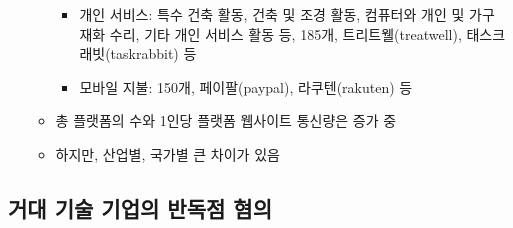 \begin{itemize}
\begin{itemize}
\begin{itemize}
		\item 개인 서비스: 특수 건축 활동, 건축 및 조경 활동, 컴퓨터와 개인 및 가구 재화 수리, 기타 개인 서비스 활동 등, 185개, 트리트웰(treatwell), 태스크래빗(taskrabbit) 등
		\item 모바일 지불: 150개, 페이팔(paypal), 라쿠텐(rakuten) 등
		\end{itemize}
	\item 총 플랫폼의 수와 1인당 플랫폼 웹사이트 통신량은 증가 중
	\item 하지만, 산업별, 국가별 큰 차이가 있음
	\end{itemize}
\end{itemize}

\subsection{거대 기술 기업의 반독점 혐의}\label{sec:}

